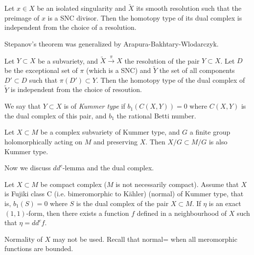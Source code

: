 \begin{theorem}[Stepanov]
Let $x \in X$ be an isolated singularity
and $\tilde{X}$ its smooth resolution such that
the preimage of $x$ is a SNC divisor.
Then the homotopy type of its dual complex is independent from
the choice of a resolution.
\end{theorem}

\noindent
Stepanov's theorem was generalized by
Arapura-Bakhtary-Wlodarczyk.

\begin{theorem}[ABW]
\label{theorem-abw}
Let $Y \subset X$ be a subvariety,
and $\tilde{X} \xrightarrow{\pi}X$ the resolution of the pair
$Y \subset X$.
Let $D$ be the exceptional set of $\pi$ (which is a SNC)
and $\tilde{Y}$ the set of all components
$D' \subset D$ such that $\pi(D')\subset Y$.
Then the homotopy type of the dual complex of $\tilde{Y}$
is independent from the choice of resoution.
\end{theorem}

\begin{definition}
\label{definition-kummer-type}
We say that $Y \subset X$ is of {\it Kummer type} 
if $b_1(C(X,Y))=0$ where $C(X,Y)$ is the dual complex
of this pair, and $b_1$ the rational Betti number.
\end{definition}

\begin{theorem}
\label{theorem-kummer-type}
Let $X \subset M$ be a complex subvariety of Kummer type,
and $G$ a finite group holomorphically acting on $M$
and preserving $X$.
Then $X/G \subset M/G$ is also Kummer type.
\end{theorem}

\medskip\noindent
Now we discuss $dd^c$-lemma and the dual complex.

\begin{theorem}
\label{theorem-kummer-type-manifolds}
Let $X \subset M$ be compact complex ($M$ is not necessarily compact).
Assume that $X$ is Fujiki class C
(i.e. bimeromorphic to Kähler) (normal) of Kummer type,
that is, $b_1(S)=0$ where $S$ is the dual complex
of the pair $X \subset M$.
If $\eta$ is an exact $(1,1)$-form,
then there exists a function $f$ defined
in a neighbourhood of $X$ such that $\eta=dd^cf$.
\end{theorem}

\begin{remark}
\label{remark-normality}
Normality of $X$ may not be used.
Recall that normal= when all meromorphic functions are bounded.
\end{remark}

